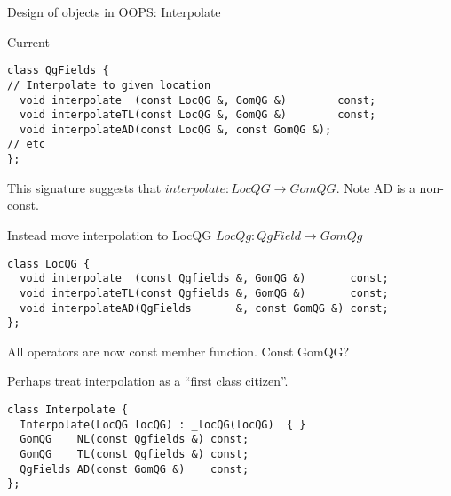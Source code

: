 \documentclass[9pt]{beamer}
\begin{document}
\begin{frame}[fragile]{Design of objects in OOPS: Interpolate}

Current

\begin{lstlisting}
class QgFields {
// Interpolate to given location
  void interpolate  (const LocQG &, GomQG &)        const;
  void interpolateTL(const LocQG &, GomQG &)        const;
  void interpolateAD(const LocQG &, const GomQG &);
// etc
};
\end{lstlisting}
This signature suggests that $interpolate: LocQG \rightarrow GomQG$. Note AD is a non-const. 

\pause
Instead move interpolation to LocQG
$LocQg : QgField \rightarrow GomQg$
\begin{lstlisting}
class LocQG {
  void interpolate  (const Qgfields &, GomQG &)       const;
  void interpolateTL(const Qgfields &, GomQG &)       const;
  void interpolateAD(QgFields       &, const GomQG &) const;
};
\end{lstlisting}

All operators are now const member function.  Const GomQG?
\pause

Perhaps treat interpolation as a ``first class citizen''. 

\begin{lstlisting}
class Interpolate { 
  Interpolate(LocQG locQG) : _locQG(locQG)  { }
  GomQG    NL(const Qgfields &) const;
  GomQG    TL(const Qgfields &) const;
  QgFields AD(const GomQG &)    const;
};
\end{lstlisting}
\end{frame}
\end{document}

